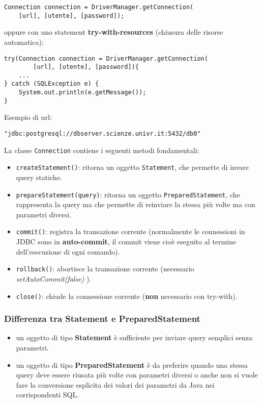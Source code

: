 \documentclass[a4paper, 10pt, titlepage]{article}
\begin{document}
\begin{lstlisting}
Connection connection = DriverManager.getConnection(
	[url], [utente], [password]);
\end{lstlisting}
oppure con uno statement \textbf{try-with-resources} (chiusura delle risorse automatica):
\begin{lstlisting}
try(Connection connection = DriverManager.getConnection(
		[url], [utente], [password]){
	...
} catch (SQLException e) {
	System.out.println(e.getMessage());
}
\end{lstlisting}
Esempio di url:
\begin{lstlisting}
"jdbc:postgresql://dbserver.scienze.univr.it:5432/db0"
\end{lstlisting}\medskip
La classe \lstinline|Connection| contiene i seguenti metodi fondamentali:
\begin{itemize}
\item \lstinline|createStatement()|: ritorna un oggetto \lstinline|Statement|, che permette di invare query statiche.
\item \lstinline|prepareStatement(query)|: ritorna un oggetto \lstinline|PreparedStatement|, che rappresenta la query ma che permette di reinviare la stessa più volte ma con parametri diversi.
\item \lstinline|commit()|: registra la transazione corrente (normalmente le connessioni in JDBC sono in \textbf{auto-commit}, il commit viene cioè eseguito al termine dell'esecuzione di ogni comando).
\item \lstinline|rollback()|: abortisce la transazione corrente (necessario \textit{setAutoCommit(false)} ).
\item \lstinline|close()|: chiude la connessione corrente (\textbf{non} necessario con try-with).
\end{itemize}

\subsubsection{Differenza tra Statement e PreparedStatement}
\begin{itemize}
\item un oggetto di tipo \textbf{Statement} è sufficiente per inviare query semplici senza parametri.
\item un oggetto di tipo \textbf{PreparedStatement} è da preferire quando una stessa query deve essere riusata più volte con parametri diversi o anche non si vuole fare la conversione esplicita dei valori dei parametri da Java nei corrispondenti SQL.
\end{itemize}
\end{document}
